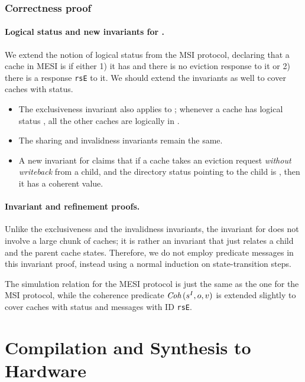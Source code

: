 \documentclass[sigplan,10pt,review,anonymous,screen]{acmart}\settopmatter{printfolios=true,printccs=false,printacmref=false}
\def\slstinline{\lstinline[basicstyle=\ttfamily\small]}
\begin{document}
\subsubsection{Correctness proof}
\label{sec-mesi-proof}

\paragraph{Logical status and new invariants for \stE{}.}
We extend the notion of logical status from the MSI protocol, declaring that a cache in MESI is \stE{} if either 1) it has \stE{} and there is no eviction response to it or 2) there is a response \slstinline{rsE} to it.
We should extend the invariants as well to cover caches with \stE{} status.
\begin{itemize}
\item The exclusiveness invariant also applies to \stE{}; whenever a cache has logical status \stE{}, all the other caches are logically in \stI{}.
\item The sharing and invalidness invariants remain the same.
\item A new invariant for \stE{} claims that if a cache takes an eviction request \emph{without writeback} from a child, and the directory status pointing to the child is \stE{}, then it has a coherent value.
\end{itemize}

\paragraph{Invariant and refinement proofs.}
Unlike the exclusiveness and the invalidness invariants, the invariant for \stE{} does not involve a large chunk of caches; it is rather an invariant that just relates a child and the parent cache states.
Therefore, we do not employ predicate messages in this invariant proof, instead using a normal induction on state-transition steps.

The simulation relation for the MESI protocol is just the same as the one for the MSI protocol, while the coherence predicate $\textit{Coh}\,(s^I, o, v)$ is extended slightly to cover caches with \stE{} status and messages with ID \slstinline{rsE}.

\section{Compilation and Synthesis to Hardware}
\label{sec-synthesis}
\end{document}

